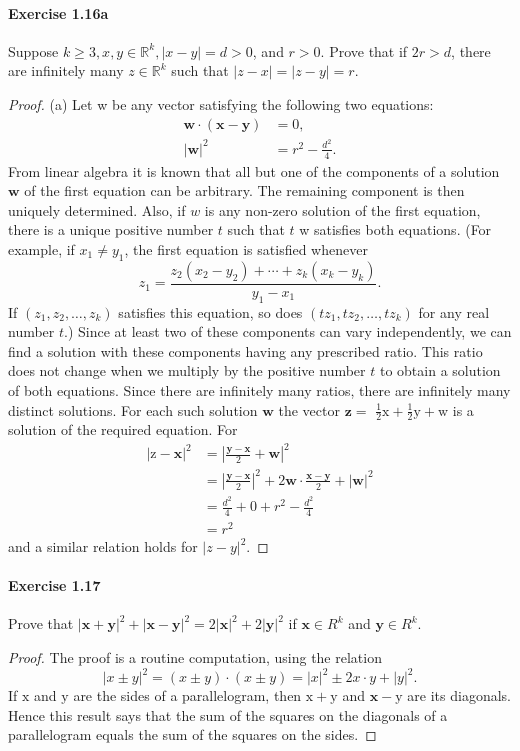 \documentclass{article}
\theoremstyle{definition}
\begin{document}
\paragraph{Exercise 1.16a} Suppose $k \geq 3, x, y \in \mathbb{R}^k, |x - y| = d > 0$, and $r > 0$. Prove that if $2r > d$, there are infinitely many $z \in \mathbb{R}^k$ such that $|z-x|=|z-y|=r$.
\begin{proof}
    (a) Let w be any vector satisfying the following two equations:
$$
\begin{aligned}
\mathbf{w} \cdot(\mathbf{x}-\mathbf{y}) &=0, \\
|\mathbf{w}|^2 &=r^2-\frac{d^2}{4} .
\end{aligned}
$$
From linear algebra it is known that all but one of the components of a solution $\mathbf{w}$ of the first equation can be arbitrary. The remaining component is then uniquely determined. Also, if $w$ is any non-zero solution of the first equation, there is a unique positive number $t$ such that $t$ w satisfies both equations. (For example, if $x_1 \neq y_1$, the first equation is satisfied whenever
$$
z_1=\frac{z_2\left(x_2-y_2\right)+\cdots+z_k\left(x_k-y_k\right)}{y_1-x_1} .
$$
If $\left(z_1, z_2, \ldots, z_k\right)$ satisfies this equation, so does $\left(t z_1, t z_2, \ldots, t z_k\right)$ for any real number $t$.) Since at least two of these components can vary independently, we can find a solution with these components having any prescribed ratio. This ratio does not change when we multiply by the positive number $t$ to obtain a solution of both equations. Since there are infinitely many ratios, there are infinitely many distinct solutions. For each such solution $\mathbf{w}$ the vector $\mathbf{z}=$ $\frac{1}{2} \mathrm{x}+\frac{1}{2} \mathrm{y}+\mathrm{w}$ is a solution of the required equation. For
$$
\begin{aligned}
|\mathrm{z}-\mathbf{x}|^2 &=\left|\frac{\mathbf{y}-\mathbf{x}}{2}+\mathbf{w}\right|^2 \\
&=\left|\frac{\mathbf{y}-\mathbf{x}}{2}\right|^2+2 \mathbf{w} \cdot \frac{\mathbf{x}-\mathbf{y}}{2}+|\mathbf{w}|^2 \\
&=\frac{d^2}{4}+0+r^2-\frac{d^2}{4} \\
&=r^2
\end{aligned}
$$
and a similar relation holds for $|z-y|^2$.
\end{proof}


\paragraph{Exercise 1.17} Prove that $|\mathbf{x}+\mathbf{y}|^{2}+|\mathbf{x}-\mathbf{y}|^{2}=2|\mathbf{x}|^{2}+2|\mathbf{y}|^{2}$ if $\mathbf{x} \in R^{k}$ and $\mathbf{y} \in R^{k}$.
\begin{proof}
    The proof is a routine computation, using the relation
$$
|x \pm y|^2=(x \pm y) \cdot(x \pm y)=|x|^2 \pm 2 x \cdot y+|y|^2 .
$$
If $\mathrm{x}$ and $\mathrm{y}$ are the sides of a parallelogram, then $\mathrm{x}+\mathrm{y}$ and $\mathbf{x}-\mathrm{y}$ are its diagonals. Hence this result says that the sum of the squares on the diagonals of a parallelogram equals the sum of the squares on the sides.
\end{proof}
\end{document}

